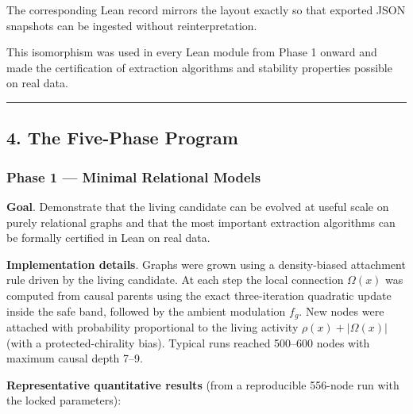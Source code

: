 \documentclass[
  11pt,
  a4paper,
]{article}
\begin{document}
The corresponding Lean record mirrors the layout exactly so that
exported JSON snapshots can be ingested without reinterpretation.

This isomorphism was used in every Lean module from Phase 1 onward and
made the certification of extraction algorithms and stability properties
possible on real data.

\begin{center}\rule{0.5\linewidth}{0.5pt}\end{center}

\subsection{4. The Five-Phase Program}\label{the-five-phase-program}

\subsubsection{Phase 1 --- Minimal Relational
Models}\label{phase-1-minimal-relational-models}

\textbf{Goal}. Demonstrate that the living candidate can be evolved at
useful scale on purely relational graphs and that the most important
extraction algorithms can be formally certified in Lean on real data.

\textbf{Implementation details}. Graphs were grown using a
density-biased attachment rule driven by the living candidate. At each
step the local connection \(\Omega(x)\) was computed from causal parents
using the exact three-iteration quadratic update inside the safe band,
followed by the ambient modulation \(f_g\). New nodes were attached with
probability proportional to the living activity
\(\rho(x) + |\Omega(x)|\) (with a protected-chirality bias). Typical
runs reached 500--600 nodes with maximum causal depth 7--9.

\textbf{Representative quantitative results} (from a reproducible
556-node run with the locked parameters):
\end{document}
